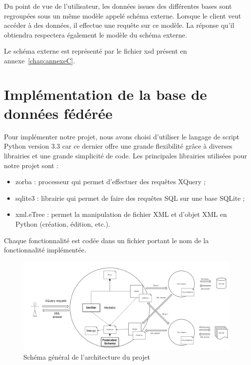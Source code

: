 Du point de vue de l'utilisateur, les données issues des différentes bases sont regroupées sous un même modèle appelé schéma externe. Lorsque le client veut accéder à des données, il effectue une requête sur ce modèle. La réponse qu'il obtiendra respectera également le modèle du schéma externe.

Le schéma externe est représenté par le fichier xsd présent en annexe~\ref{chap:annexeC}.

\section{Implémentation de la base de données fédérée}

Pour implémenter notre projet, nous avons choisi d'utiliser le langage de script Python version 3.3 car ce dernier offre une grande flexibilité grâce à diverses librairies et une grande simplicité de code. Les principales librairies utilisées pour notre projet sont :

\begin{itemize}
    \item zorba : processeur qui permet d'effectuer des requêtes XQuery ;

    \item sqlite3 : librairie qui permet de faire des requêtes SQL sur une base SQLite ;

    \item xml.eTree : permet la manipulation de fichier XML et d'objet XML en Python (création, édition, etc.).
\end{itemize}

Chaque fonctionnalité est codée dans un fichier portant le nom de la fonctionnalité implémentée.

\begin{figure}[h!]
    \centering
    \includegraphics[width=1\textwidth]{ressources/graphiques/architecture.png}
    \caption{Schéma général de l'architecture du projet}
\end{figure}

